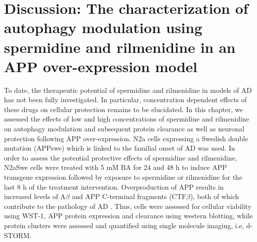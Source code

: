 \section{Discussion: The characterization of autophagy modulation using spermidine and rilmenidine in an APP over-expression model}
To date, the therapeutic potential of spermidine and rilmenidine in models of AD has not been fully investigated. In particular, concentration dependent effects of these drugs on cellular protection remains to be elucidated. In this chapter, we assessed the effects of low and high concentrations of spermidine and rilmenidine on autophagy modulation and subsequent protein clearance as well as neuronal protection following APP over-expression. N2a cells expressing a Swedish double mutation (APPswe) which is linked to the familial onset of AD was used. In order to assess the potential protective effects of spermidine and rilmenidine, N2aSwe cells were treated with 5 mM BA for 24 and 48 h to induce APP transgene expression \citep{Sisodia1990,Lo1994} followed by exposure to spermidine or rilmenidine for the last 8 h of the treatment intervention. Overproduction of APP results in increased levels of A$\beta$ and APP C-terminal fragments (CTF$\beta$), both of which contribute to the pathology of AD \citep{Walsh2007}. Thus, cells were assessed for cellular viability using WST-1, APP protein expression and clearance using western blotting, while protein clusters were assessed and quantified using single molecule imaging, i.e, d-STORM.

